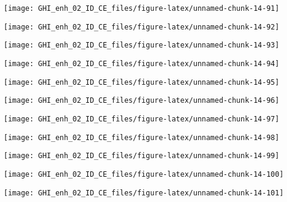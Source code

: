 \documentclass[
  10pt,
  a4paper,oneside]{article}
\begin{document}
\begin{center}\texttt{[image: GHI\_enh\_02\_ID\_CE\_files/figure-latex/unnamed-chunk-14-91]} \end{center}

\begin{center}\texttt{[image: GHI\_enh\_02\_ID\_CE\_files/figure-latex/unnamed-chunk-14-92]} \end{center}

\begin{center}\texttt{[image: GHI\_enh\_02\_ID\_CE\_files/figure-latex/unnamed-chunk-14-93]} \end{center}

\begin{center}\texttt{[image: GHI\_enh\_02\_ID\_CE\_files/figure-latex/unnamed-chunk-14-94]} \end{center}

\begin{center}\texttt{[image: GHI\_enh\_02\_ID\_CE\_files/figure-latex/unnamed-chunk-14-95]} \end{center}

\begin{center}\texttt{[image: GHI\_enh\_02\_ID\_CE\_files/figure-latex/unnamed-chunk-14-96]} \end{center}

\begin{center}\texttt{[image: GHI\_enh\_02\_ID\_CE\_files/figure-latex/unnamed-chunk-14-97]} \end{center}

\begin{center}\texttt{[image: GHI\_enh\_02\_ID\_CE\_files/figure-latex/unnamed-chunk-14-98]} \end{center}

\begin{center}\texttt{[image: GHI\_enh\_02\_ID\_CE\_files/figure-latex/unnamed-chunk-14-99]} \end{center}

\begin{center}\texttt{[image: GHI\_enh\_02\_ID\_CE\_files/figure-latex/unnamed-chunk-14-100]} \end{center}

\begin{center}\texttt{[image: GHI\_enh\_02\_ID\_CE\_files/figure-latex/unnamed-chunk-14-101]} \end{center}
\end{document}
